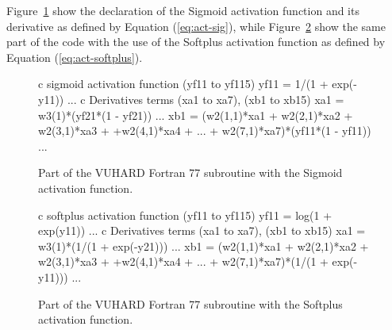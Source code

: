 \documentclass[algorithms,article,submit,pdftex,oneauthors]{Definitions/mdpi}
\begin{document}
Figure~\ref{fig:FortranSigmoid} show the declaration of the Sigmoid activation function and its derivative as defined by Equation (\ref{eq:act-sig}), while Figure~\ref{fig:FortranSoftplus} show the same part of the code with the use of the Softplus activation function as defined by Equation (\ref{eq:act-softplus}).
\begin{figure}[h!]
\begin{FortranListing}
c sigmoid activation function (yf11 to yf115)
      yf11 = 1/(1 + exp(-y11))
      ...
c Derivatives terms (xa1 to xa7), (xb1 to xb15)
      xa1 = w3(1)*(yf21*(1 - yf21))
      ...
      xb1 = (w2(1,1)*xa1 + w2(2,1)*xa2 + w2(3,1)*xa3
     + +w2(4,1)*xa4 + ... + w2(7,1)*xa7)*(yf11*(1 - yf11))
      ...
\end{FortranListing}
\caption{Part of the VUHARD Fortran 77 subroutine with the Sigmoid activation function.\label{fig:FortranSigmoid}}
\end{figure}
\begin{figure}[h!]
\begin{FortranListing}
c softplus activation function (yf11 to yf115)
      yf11 = log(1 + exp(y11))
      ...
c Derivatives terms (xa1 to xa7), (xb1 to xb15)
      xa1 = w3(1)*(1/(1 + exp(-y21)))
      ...
      xb1 = (w2(1,1)*xa1 + w2(2,1)*xa2 + w2(3,1)*xa3
     + +w2(4,1)*xa4 + ... + w2(7,1)*xa7)*(1/(1 + exp(-y11)))
      ...
\end{FortranListing}
\caption{Part of the VUHARD Fortran 77 subroutine with the Softplus activation function.\label{fig:FortranSoftplus}}
\end{figure}
\end{document}
